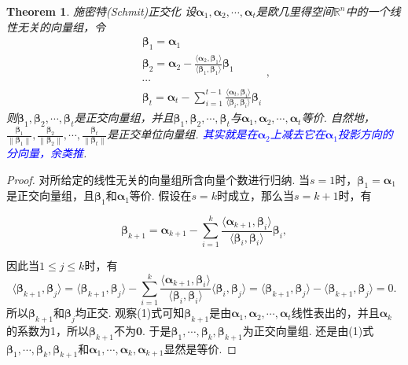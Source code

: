 \documentclass{article}
\newtheorem{theorem}{Theorem}[section]
\newcommand{\norm}[1]{\left\lVert#1\right\rVert} %
\newcommand{\mbf}[1]{\bm{#1}}
\newcommand\inp[2]{\langle #1, #2 \rangle} %
\newcommand{\bluet}[1]{\textcolor{blue}{#1}}
\begin{document}
\begin{theorem}
\rm {\color{red}施密特(Schmit)正交化} 设$\mbf{\alpha}_1,\mbf{\alpha}_2,\cdots,\mbf{\alpha}_t$是欧几里得空间$\mathbb{R}^n$中的一个线性无关的向量组，令
$$
\begin{array}{ll}
\mbf{\beta}_1 = \mbf{\alpha}_1 \\
\mbf{\beta}_2 = \mbf{\alpha}_2 - \frac{\inp{\mbf{\alpha}_2}{\mbf{\beta}_1}}{\inp{\mbf{\beta}_1}{\mbf{\beta}_1}}\mbf{\beta}_1\\
\cdots \\
\mbf{\beta}_t = \mbf{\alpha}_t - \sum\limits_{i = 1}^{t-1}\frac{\inp{\mbf{\alpha}_t}{\mbf{\beta}_i}}{\inp{\mbf{\beta}_i}{\mbf{\beta}_i}}\mbf{\beta}_i
\end{array},
$$
则$\mbf{\beta}_1,\mbf{\beta}_2,\cdots,\mbf{\beta}_t$是正交向量组，并且$\mbf{\beta}_1,\mbf{\beta}_2,\cdots,\mbf{\beta}_t$与$\mbf{\alpha}_1,\mbf{\alpha}_2,\cdots,\mbf{\alpha}_t$等价. 自然地，$\frac{\mbf{\beta}_1}{\norm{\mbf{\beta}_1}},\frac{\mbf{\beta}_2}{\norm{\mbf{\beta}_2}},\cdots,\frac{\mbf{\beta}_t}{\norm{\mbf{\beta}_t}}$是正交单位向量组. \bluet{其实就是在$\mbf{\alpha}_2$上减去它在$\mbf{\alpha}_1$投影方向的分向量，余类推}. 
\end{theorem}

\begin{proof}
对所给定的线性无关的向量组所含向量个数进行归纳. 当$s = 1$时，$\mbf{\beta}_1 = \mbf{\alpha}_1$是正交向量组，且$\mbf{\beta}_1$和$\mbf{\alpha}_1$等价. 假设在$s = k$时成立，那么当$s = k+1$时，有

\begin{equation}
\mbf{\beta}_{k+1} = \mbf{\alpha}_{k+1} - \sum\limits_{i = 1}^{k}\frac{\inp{\mbf{\alpha}_{k+1}}{\mbf{\beta}_i}}{\inp{\mbf{\beta}_i}{\mbf{\beta}_i}}\mbf{\beta}_i,
\end{equation}

因此当$1\leq j \leq k$时，有
$$
\inp{\mbf{\beta}_{k+1}}{\mbf{\beta}_{j}} = \inp{\mbf{\beta}_{k+1}}{\mbf{\beta}_{j}}-\sum\limits_{i = 1}^{k}\frac{\inp{\mbf{\alpha}_{k+1}}{\mbf{\beta}_i}}{\inp{\mbf{\beta}_i}{\mbf{\beta}_i}}\inp{\mbf{\beta}_i}{\mbf{\beta}_j} = \inp{\mbf{\beta}_{k+1}}{\mbf{\beta}_{j}} - \inp{\mbf{\beta}_{k+1}}{\mbf{\beta}_{j}} = 0.
$$
所以$\mbf{\beta}_{k+1}$和$\mbf{\beta}_{j}$均正交. 观察(1)式可知$\mbf{\beta}_{k+1}$是由$\mbf{\alpha}_1,\mbf{\alpha}_2,\cdots,\mbf{\alpha}_t$线性表出的，并且$\mbf{\alpha}_k$的系数为1，所以$\mbf{\beta}_{k+1}$不为$\mbf{0}$. 于是$\mbf{\beta}_{1},\cdots,\mbf{\beta}_{k},\mbf{\beta}_{k+1}$为正交向量组. 还是由(1)式$\mbf{\beta}_{1},\cdots,\mbf{\beta}_{k},\mbf{\beta}_{k+1}$和$\mbf{\alpha}_{1},\cdots,\mbf{\alpha}_{k},\mbf{\alpha}_{k+1}$显然是等价.
\end{proof}
\end{document}
